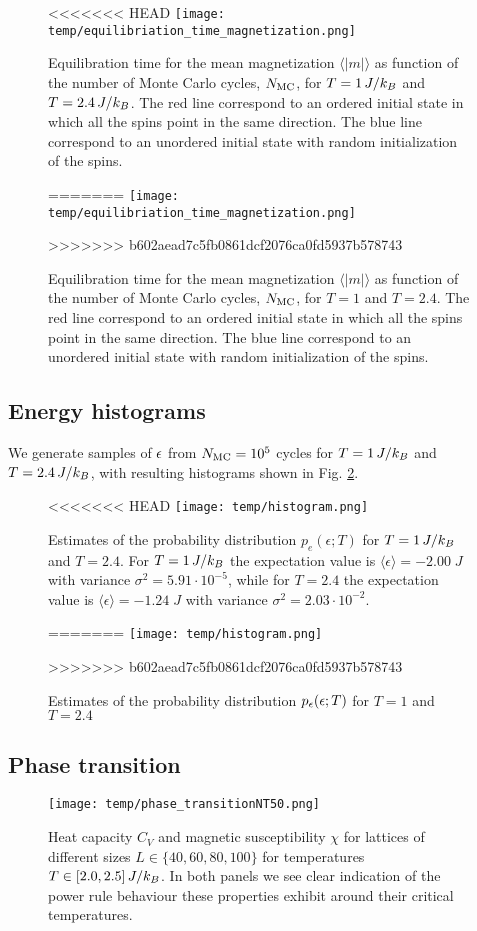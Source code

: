\begin{figure}[!ht]
<<<<<<< HEAD
    \texttt{[image: temp/equilibriation\_time\_magnetization.png]}
    \caption{Equilibration time for the mean magnetization $\langle \vert m \vert \rangle$ as function of the number of Monte Carlo cycles, $N_\mathrm{MC}$, for $T=1\,J/k_B$ and $T=2.4\,J/k_B$. The red line correspond to an ordered initial state in which all the spins point in the same direction. The blue line correspond to an unordered initial state with random initialization of the spins.}
=======
    \texttt{[image: temp/equilibriation\_time\_magnetization.png]}
    \caption{Equilibration time for the mean magnetization $\langle \vert m \vert \rangle$ as function of the number of Monte Carlo cycles, $N_\mathrm{MC}$, for $T=1$ and $T=2.4$. The red line correspond to an ordered initial state in which all the spins point in the same direction. The blue line correspond to an unordered initial state with random initialization of the spins.}
>>>>>>> b602aead7c5fb0861dcf2076ca0fd5937b578743
    \label{fig:equil_magn}
\end{figure}

\subsection{Energy histograms}\label{subsec_results:histogram}
We generate samples of $\epsilon$ from $N_\mathrm{MC}=10^5$ cycles for $T=1\,J/k_B$ and $T=2.4\,J/k_B$, with resulting histograms shown in Fig. \ref{fig:histogram}.  
\begin{figure}[!ht]
<<<<<<< HEAD
    \texttt{[image: temp/histogram.png]}
    \caption{Estimates of the probability distribution $p_e(\epsilon; T)$ for $T=1\,J/k_B$ and $T=2.4$. For $T=1\,J/k_B$ the expectation value is $\langle \epsilon \rangle = -2.00 \; J$ with variance $\sigma^2 = 5.91\cdot 10^{-5}$, while for $T=2.4$ the expectation value is $\langle \epsilon \rangle = -1.24 \; J$ with variance $\sigma^2=2.03\cdot 10^{-2}$.}
=======
    \texttt{[image: temp/histogram.png]}
    \caption{Estimates of the probability distribution $p_\epsilon(\epsilon; T)$ for $T=1$ and $T=2.4$}
>>>>>>> b602aead7c5fb0861dcf2076ca0fd5937b578743
    \label{fig:histogram}
\end{figure}

\subsection{Phase transition}\label{subsec_results:phase_transition}
\begin{figure*}[!ht]
    \texttt{[image: temp/phase\_transitionNT50.png]} 
    \caption{Heat capacity $C_V$ and magnetic susceptibility $\chi$ for lattices of different sizes $L\in\{40,60,80,100\}$ for temperatures $T\in[2.0,2.5]\,J/k_B$. In both panels we see clear indication of the power rule behaviour these properties exhibit around their critical temperatures.}
    \label{fig:phase_transition}
\end{figure*} 

